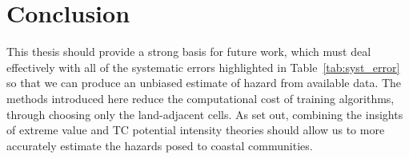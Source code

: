 \section{Conclusion}
\label{sec:8_Conclusion}


This thesis should provide a  strong basis for
future work, which must deal effectively with all of the systematic errors
highlighted in Table~\ref{tab:syst_error} so that we can produce
an unbiased estimate of hazard from available data.
The methods introduced here reduce the computational cost
of training algorithms, through choosing only the
land-adjacent cells.
As set out, combining the insights of
extreme value and TC potential intensity theories should allow
us to more accurately estimate the hazards posed to coastal communities.
